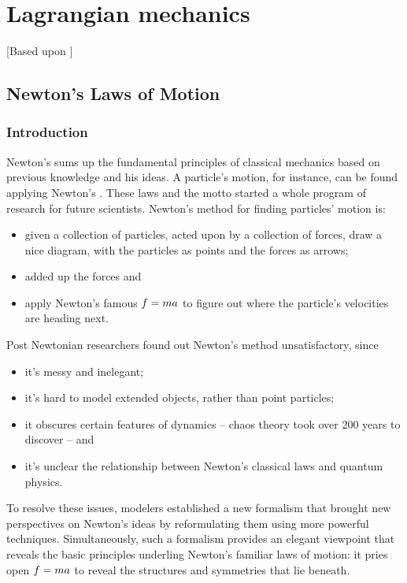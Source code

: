 \chapter{Lagrangian mechanics}
%
[Based upon \citep{tong:2004}]


\section{Newton's Laws of Motion}
%
\subsection{Introduction}
%
Newton's  sums up the fundamental principles of classical mechanics based on previous knowledge and his ideas. A particle's motion, for instance, can be found applying Newton's . These laws and the motto  started a whole program of research for future scientists.
%
%
Newton's method for finding particles' motion is:
%
\begin{itemize}
%
\item given a collection of particles, acted upon by a collection of forces, draw a nice diagram, with the particles as points and the forces as arrows;
%
\item added up the forces and 
%
\item apply Newton's famous $f = ma$ to figure out where the particle's velocities are heading next. 
%
\end{itemize}

Post Newtonian researchers found out Newton's method unsatisfactory, since
%
\begin{itemize}
%
\item it's messy and inelegant; 
%
\item it's hard to model extended objects, rather than point particles; 
%
\item it obscures certain features of dynamics -- chaos theory took over 200 years to discover -- and 
%
\item it's unclear the relationship between Newton's classical laws and quantum physics.
%
\end{itemize}

To resolve these issues, modelers established a new formalism that brought new perspectives on Newton's ideas by reformulating them using more powerful techniques.
%
%
Simultaneously, such a formalism provides an elegant viewpoint that reveals the basic principles underling Newton's familiar laws of motion: it pries open $f = ma$ to reveal the structures and symmetries that lie beneath.

